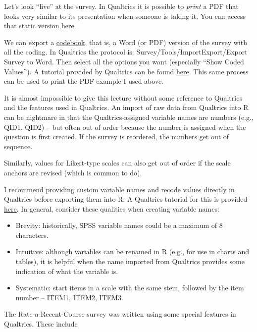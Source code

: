 \documentclass[
  english,
]{book}
\providecommand{\tightlist}{%
  \setlength{\itemsep}{0pt}\setlength{\parskip}{0pt}}
\begin{document}
Let's look ``live'' at the survey. In Qualtrics it is possible to \emph{print} a PDF that looks very similar to its presentation when someone is taking it. You can access that static version \href{./Rate_a_CoursePDF.pdf}{here}.

We can export a \href{./Rate-a-Course_Codebook.pdf}{codebook}, that is, a Word (or PDF) version of the survey with all the coding. In Qualtrics the protocol is: Survey/Tools/ImportExport/Export Survey to Word. Then select all the options you want (especially ``Show Coded Values''). A tutorial provided by Qualtrics can be found \href{https://www.qualtrics.com/support/survey-platform/survey-module/survey-tools/import-and-export-surveys/}{here}. This same process can be used to print the PDF example I used above.

It is almost impossible to give this lecture without some reference to Qualtrics and the features used in Qualtrics. An import of raw data from Qualtrics into R can be nightmare in that the Qualtrics-assigned variable names are numbers (e.g., QID1, QID2) -- but often out of order because the number is assigned when the question is first created. If the survey is reordered, the numbers get out of sequence.

Similarly, values for Likert-type scales can also get out of order if the scale anchors are revised (which is common to do).

I recommend providing custom variable names and recode values directly in Qualtrics before exporting them into R. A Qualtrics tutorial for this is provided \href{https://www.qualtrics.com/support/survey-platform/survey-module/question-options/recode-values/}{here}. In general, consider these qualities when creating variable names:

\begin{itemize}
\tightlist
\item
  Brevity: historically, SPSS variable names could be a maximum of 8 characters.
\item
  Intuitive: although variables can be renamed in R (e.g., for use in charts and tables), it is helpful when the name imported from Qualtrics provides some indication of what the variable is.
\item
  Systematic: start items in a scale with the same stem, followed by the item number -- ITEM1, ITEM2, ITEM3.
\end{itemize}

The Rate-a-Recent-Course survey was written using some special features in Qualtrics. These include
\end{document}
